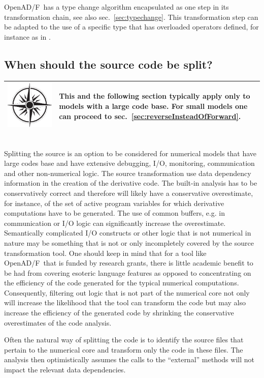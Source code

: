 \documentclass{book}
\newcommand{\OpenADF}{OpenAD/F}
\newcommand{\refsec}[1]{{sec.~\ref{#1}}}
\newcommand{\nav}[1]{
\begin{tabular}{|m{.03\textwidth}|m{.92\textwidth}|}\hline
\vspace{1mm}
\includegraphics[width=.03\textwidth]{windrose_zh1}&
\vspace{1mm}
\begin{minipage}[c]{.86\textwidth}
\small {#1}
\end{minipage}
\vspace{1mm}
\\\hline
\end{tabular}
}
\begin{document}
\OpenADF\ has a type change algorithm encapsulated as one step in its transformation chain, see also \refsec{sec:typechange}.
This transformation step can be adapted to the use of a specific type that has overloaded operators defined, for 
instance as in \cite{rapsodiaWeb}.

\subsection{When should the source code be split?}\label{sec:SplittingSource}
\nav{This and the following section typically apply only to models with a large code base.
For small models one can proceed to \refsec{sec:reverseInsteadOfForward}.}\\[1ex] 
Splitting the source is an option to be considered for numerical models that have 
large codes base and have extensive debugging, I/O, monitoring, communication and other 
non-numerical logic. 
The source transformation use data dependency information in the creation of the derivative 
code. The built-in analysis has to be conservatively correct and therefore will likely 
have a conservative overestimate, for instance, of the set of active program variables
for which derivative computations have to be generated. 
The use of common buffers, e.g. in communication or I/O logic can significantly increase the 
overestimate. 
Semantically complicated I/O constructs or other logic that 
is not numerical in nature may be something that is not or only incompletely covered by 
the source transformation tool. 
One should keep in mind that for a tool like \OpenADF\ that is funded by research grants, there is 
little academic benefit to be had from covering esoteric language features as opposed to concentrating 
on the efficiency of the code generated for the typical numerical computations. 
Consequently, filtering out logic that is not part of the numerical core not only will 
increase the likelihood that the tool can transform the code but may also  increase the 
efficiency of the generated code by shrinking the conservative overestimates of the code analysis.

Often the natural way of splitting the code is to identify the source files that pertain to 
the  numerical core and transform only the code in these files.  
The analysis then optimistically assumes the calls to the ``external'' methods will not impact the 
relevant data dependencies.          
\end{document}
